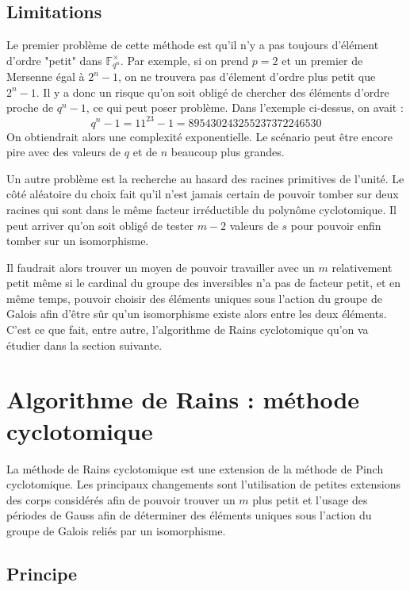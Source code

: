 \documentclass[a4paper]{article} %
\numberwithin{section}{part}
\numberwithin{equation}{section}
\newcommand\GF[1]{\mathbb{F}_{#1}}
\begin{document}
\subsection{Limitations}
Le premier problème de cette méthode est qu'il n'y a pas toujours d'élément
d'ordre "petit" dans $\GF{q^n}^{\times}$. Par exemple, si on prend $p = 2$ et un
premier de Mersenne égal à $2^n - 1$, on ne trouvera pas d'élement d'ordre plus
petit que $2^n - 1$. Il y a donc un risque qu'on soit obligé de chercher des
éléments d'ordre proche de $q^n - 1$, ce qui peut poser problème. Dans l'exemple
ci-dessus, on avait :
\[q^n - 1 = 11^{23} - 1 = 895430243255237372246530\]
On obtiendrait alors une complexité exponentielle. Le scénario peut être encore 
pire avec des valeurs de $q$ et de $n$ beaucoup plus grandes.\par
Un autre problème est la recherche au hasard des racines primitives de l'unité. 
Le côté aléatoire du choix fait qu'il n'est jamais certain de pouvoir tomber sur
deux racines qui sont dans le même facteur irréductible du polynôme
cyclotomique. Il peut arriver qu'on soit obligé de tester $m-2$ valeurs de $s$
pour pouvoir enfin tomber sur un isomorphisme.\par
Il faudrait alors trouver un moyen de pouvoir travailler avec un $m$
relativement petit même si le cardinal du groupe des inversibles n'a pas de
facteur petit, et en même temps, pouvoir choisir des éléments uniques sous
l'action du groupe de Galois afin d'être sûr qu'un isomorphisme existe alors
entre les deux éléments. C'est ce que fait, entre autre, l'algorithme de Rains 
cyclotomique qu'on va étudier dans la section suivante.


\section{Algorithme de Rains : méthode cyclotomique}
La méthode de Rains cyclotomique est une extension de la méthode de Pinch
cyclotomique. Les principaux changements sont l'utilisation de petites
extensions des corps considérés afin de pouvoir trouver un $m$ plus petit et
l'usage des périodes de Gauss afin de déterminer des éléments uniques sous
l'action du groupe de Galois reliés par un isomorphisme.

\subsection{Principe}
\end{document}
